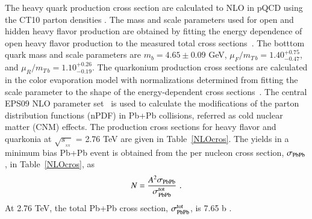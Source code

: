 The heavy quark production cross section are calculated to NLO in pQCD  
using the CT10 parton densities \cite{Lai:2010vv}. The mass and scale parameters used 
for open and hidden heavy flavor production are obtained by fitting the energy dependence 
of open heavy flavor production to the measured total cross sections~\cite{Nelson:2012bc}.
The botttom quark mass and scale parameters are $m_b = 4.65 \pm 0.09$ GeV,
$\mu_F/m_{T\, b} = 1.40^{+0.75}_{-0.47}$, and $\mu_R/m_{T\, b} = 1.10^{+0.26}_{-0.19}$.
The quarkonium production cross sections are calculated in the color evaporation model with
normalizations determined from fitting the scale parameter to the shape of the energy-dependent
cross sections~\cite{Nelson:2012bc}.
The central EPS09 NLO parameter set~\cite{Eskola:2009uj} is used to 
calculate the modifications of the parton distribution functions (nPDF) in 
Pb+Pb collisions, referred as cold nuclear matter (CNM) effects.
The production cross sections for heavy flavor and quarkonia at $\sqrt{s_{_{_{NN}}}}$ = 2.76 
TeV \cite{Kumar:2012qx} are given in Table~\ref{NLOcros}.  The yields in a minimum bias 
Pb+Pb event is obtained from the per nucleon cross
section, $\sigma_{\rm PbPb}$, in Table~\ref{NLOcros}, as
\begin{eqnarray}
N = {A^2 \sigma_{\rm PbPb} \over  
\sigma_{\rm PbPb}^{\rm tot}} \, \, .
\end{eqnarray}
 At 2.76 TeV, the total Pb+Pb cross section, $\sigma_{\rm PbPb}^{\rm tot}$, 
is 7.65 b \cite{Chatrchyan:2011sx}.


